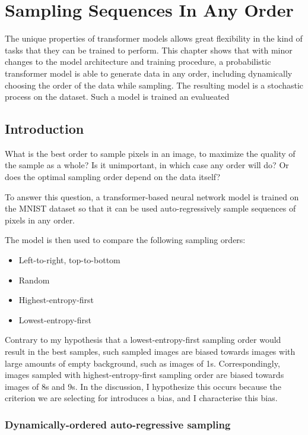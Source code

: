 \chapter{Sampling Sequences In Any Order}
\label{C:a-o-sampling}

The unique properties of transformer models allows great flexibility in the kind of tasks that they can be trained to perform. This chapter shows that with minor changes to the model architecture and training procedure, a probabilistic transformer model is able to generate data in any order, including dynamically choosing the order of the data while sampling. The resulting model is a stochastic process on the dataset. Such a model is trained an evalueated 

\section{Introduction}

What is the best order to sample pixels in an image, to maximize the quality of the sample as a whole? Is it unimportant, in which case any order will do? Or does the optimal sampling order depend on the data itself?

To answer this question, a transformer-based neural network model is trained on the MNIST dataset \cite{mnist} so that it can be used auto-regressively sample sequences of pixels in any order.

The model is then used to compare the following sampling orders:
\begin{itemize}
    \item Left-to-right, top-to-bottom
    \item Random
    \item Highest-entropy-first
    \item Lowest-entropy-first
\end{itemize}

Contrary to my hypothesis that a lowest-entropy-first sampling order would result in the best samples, such sampled images are biased towards images with large amounts of empty background, such as images of 1s. Correspondingly, images sampled with highest-entropy-first sampling order are biased towards images of 8s and 9s. In the discussion, I hypothesize this occurs because the criterion we are selecting for introduces a bias, and I characterise this bias.

\subsection{Dynamically-ordered auto-regressive sampling}

